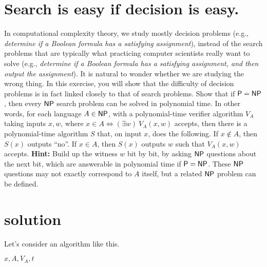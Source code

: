 

\maketitle
\thispagestyle{firststyle}
\vspace{-2.0cm}

\section*{Search is easy if decision is easy.}
    In computational complexity theory, we study mostly decision problems
    (e.g., \emph{determine if a Boolean formula has a satisfying assignment}),
    instead of the search problems that are typically what practicing computer scientists really want to solve
    (e.g., \emph{determine if a Boolean formula has a satisfying assignment, and then output the assignment}).
    It is natural to wonder whether we are studying the wrong thing.
    In this exercise, you will show that the difficulty of decision problems is in fact linked closely to that of search problems.
        Show that if $\mathsf{P} = \mathsf{NP}$, then every $\mathsf{NP}$ search problem can be solved in polynomial time.
    In other words, for each language $A \in \mathsf{NP}$, with a polynomial-time verifier algorithm $V_A$ taking inputs $x,w$, where $x \in A \iff (\exists w)\ V_A(x,w)$ accepts, then there is a polynomial-time algorithm $S$ that, on input $x$, does the following.
    If $x \not\in A$, then $S(x)$ outputs ``no''.
    If $x \in A$, then $S(x)$ outputs $w$ such that $V_A(x,w)$ accepts.
        {\bf Hint:}
    Build up the witness $w$ bit by bit, by asking $\mathsf{NP}$ questions about the next bit, which are answerable in polynomial time if $\mathsf{P} = \mathsf{NP}$.
    These $\mathsf{NP}$ questions may not exactly correspond to $A$ itself, but a related $\mathsf{NP}$ problem can be defined.


\section*{solution}
Let's consider an algorithm like this.
\begin{algorithm}
\caption{$S(x)$} 
\begin{algorithmic}[]
\Require $x, A, V_A, t$
 
\EndIf
{}
\EndWhile
{}
\end{algorithmic}
\end{algorithm}

